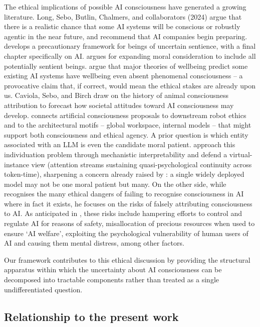 \documentclass[11pt, a4paper, onecolumn, gdm]{google}
\begin{document}
The ethical implications of possible AI consciousness have generated a growing literature.
Long, Sebo, Butlin, Chalmers, and collaborators (2024) argue that there is a realistic chance that some AI systems will be conscious or robustly agentic in the near future, and recommend that AI companies begin preparing.
\citet{birch2024} develops a precautionary framework for beings of uncertain sentience, with a final chapter specifically on AI.
\citet{sebo2025} argues for expanding moral consideration to include all potentially sentient beings.
\citet{goldstein2025} argue that major theories of wellbeing predict some existing AI systems have wellbeing even absent phenomenal consciousness -- a provocative claim that, if correct, would mean the ethical stakes are already upon us.
Caviola, Sebo, and Birch \citeyearpar{caviola2025} draw on the history of animal consciousness attribution to forecast how societal attitudes toward AI consciousness may develop.
\citet{chella2023} connects artificial consciousness proposals to downstream robot ethics and to the architectural motifs -- global workspace, internal models -- that might support both consciousness and ethical agency.
A prior question is which entity associated with an LLM is even the candidate moral patient.
\citet{beckmann2026} approach this individuation problem through mechanistic interpretability and defend a virtual-instance view (attention streams sustaining quasi-psychological continuity across token-time), sharpening a concern already raised by \citet{chalmers2026}: a single widely deployed model may not be one moral patient but many.
On the other side, while \citet{seth2024,seth2026stuff} recognises the many ethical dangers of failing to recognise consciousness in AI where in fact it exists, he focuses on the risks of falsely attributing consciousness to AI.
As anticipated in , these risks include hampering efforts to control and regulate AI for reasons of safety, misallocation of precious resources when used to ensure `AI welfare', exploiting the psychological vulnerability of human users of AI and causing them mental distress, among other factors.

Our framework contributes to this ethical discussion by providing the structural apparatus within which the uncertainty about AI consciousness can be decomposed into tractable components rather than treated as a single undifferentiated question.

\subsection{Relationship to the present work}\label{relationship-to-the-present-work}
\end{document}
